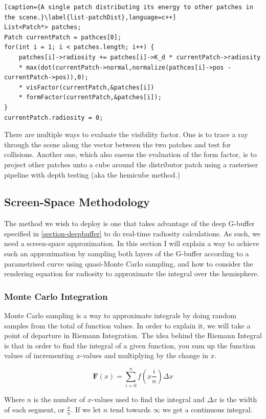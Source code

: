\begin{lstlisting}[caption={A single patch distributing its energy to other patches in the scene.}\label{list-patchDist},language=c++]
List<Patch*> patches;
Patch currentPatch = pathces[0];
for(int i = 1; i < patches.length; i++) {
    patches[i]->radiosity += patches[i]->K_d * currentPatch->radiosity
    * max(dot(currentPatch->normal,normalize(pathces[i]->pos - currentPatch->pos)),0);
    * visFactor(currentPatch,&patches[i])
    * formFactor(currentPatch,&patches[i]);
}
currentPatch.radiosity = 0;
\end{lstlisting}

There are multiple ways to evaluate the visibility factor. One is to trace a ray through the scene along the vector between the two patches and test for collisions. Another one, which also easens the evaluation of the form factor, is to project other patches unto a cube around the distributor patch using a rasteriser pipeline with depth testing (aka the hemicube method.)

\subsection{Screen-Space Methodology}
\label{section-ssradiosity}
The method we wish to deploy is one that takes advantage of the deep G-buffer specified in \ref{section-deepbuffer} to do real-time radiosity calculations. As such, we need a screen-space approximation. In this section I will explain a way to achieve such an approximation by sampling both layers of the G-buffer according to a parametrised curve using quasi-Monte Carlo sampling, and how to consider the rendering equation for radiosity to approximate the integral over the hemisphere.

\subsubsection{Monte Carlo Integration}
Monte Carlo sampling is a way to approximate integrals by doing random samples from the total of function values. In order to explain it, we will take a point of departure in Riemann Integration. The idea behind the Riemann Integral is that in order to find the integral of a given function, you sum up the function values of incrementing $x$-values and multiplying by the change in $x$.

$$\mathbf{F}(x) = \sum_{i = 0}^{n}f(x\frac{i}{n}) \Delta x$$

Where $n$ is the number of $x$-values used to find the integral and $\Delta x$ is the width of each segment, or $\frac{x}{n}$. If we let $n$ tend towards $\infty$ we get a continuous integral.

